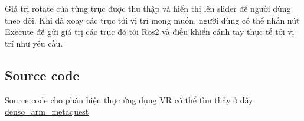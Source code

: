 Giá trị rotate của từng trục được thu thập và hiển thị lên slider để người dùng theo dõi. Khi đã xoay các trục tới vị trí mong muốn, người dùng có thể nhấn nút Execute để gửi giá trị các trục đó tới Ros2 và điều khiển cánh tay thực tế tới vị trí như yêu cầu.

\subsection{Source code}

Source code cho phần hiện thực ứng dụng VR có thể tìm thấy ở đây: \href{https://github.com/ngoccatt/denso_arm_metaquest}{denso\_arm\_metaquest}



